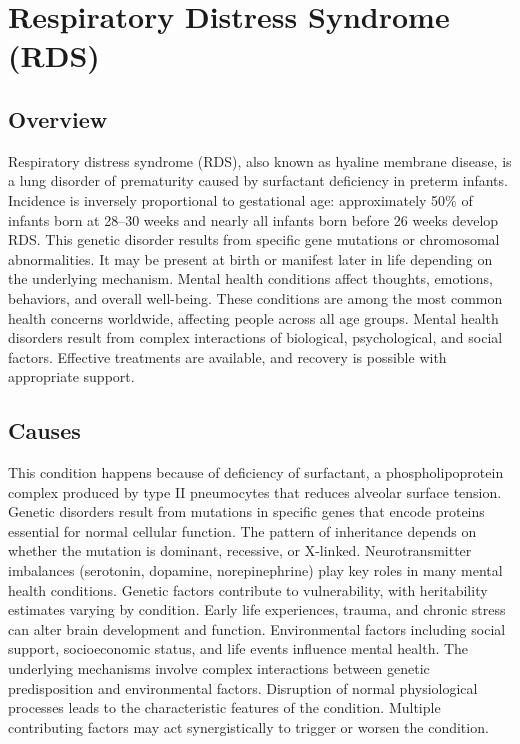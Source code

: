 \chapter{Respiratory Distress Syndrome (RDS)}
\label{sec:Respiratory Distress Syndrome}

\section{Overview}
Respiratory distress syndrome (RDS), also known as hyaline membrane disease, is a lung disorder of prematurity caused by surfactant deficiency in preterm infants. Incidence is inversely proportional to gestational age: approximately 50\% of infants born at 28--30 weeks and nearly all infants born before 26 weeks develop RDS. This genetic disorder results from specific gene mutations or chromosomal abnormalities. It may be present at birth or manifest later in life depending on the underlying mechanism. Mental health conditions affect thoughts, emotions, behaviors, and overall well-being. These conditions are among the most common health concerns worldwide, affecting people across all age groups. Mental health disorders result from complex interactions of biological, psychological, and social factors. Effective treatments are available, and recovery is possible with appropriate support.
\section{Causes}
This condition happens because of deficiency of surfactant, a phospholipoprotein complex produced by type II pneumocytes that reduces alveolar surface tension. Genetic disorders result from mutations in specific genes that encode proteins essential for normal cellular function. The pattern of inheritance depends on whether the mutation is dominant, recessive, or X-linked. Neurotransmitter imbalances (serotonin, dopamine, norepinephrine) play key roles in many mental health conditions. Genetic factors contribute to vulnerability, with heritability estimates varying by condition. Early life experiences, trauma, and chronic stress can alter brain development and function. Environmental factors including social support, socioeconomic status, and life events influence mental health. The underlying mechanisms involve complex interactions between genetic predisposition and environmental factors. Disruption of normal physiological processes leads to the characteristic features of the condition. Multiple contributing factors may act synergistically to trigger or worsen the condition.
